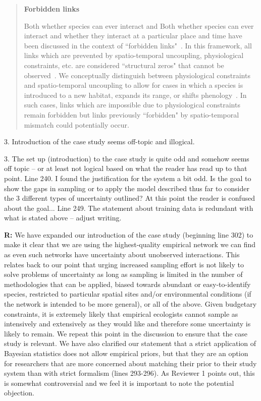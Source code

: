 \documentclass[12pt]{letter}
\newenvironment{refquote}{\bigskip \begin{it}}{\end{it}\smallskip}
\begin{document}
		\begin{quotation}
        \textbf{Forbidden links}

            Both whether species can ever interact and Both whether species can ever interact and whether they interact at a particular place and time have been discussed in the context of ``forbidden links"~\citep{Jordano2016}. In this framework, all links which are prevented by spatio-temporal uncoupling, physiological constraints, etc. are considered ``structural zeros" that cannot be observed~\citep{Jordano1987,Jordano2016}. We conceptually distinguish between physiological constraints and spatio-temporal uncoupling to allow for cases in which a species is introduced to a new habitat, expands its range, or shifts phenology~\citep{Gravel2013}. In such cases, links which are impossible due to physiological constraints remain forbidden but links previously ``forbidden" by spatio-temporal mismatch could potentially occur.
      \end{quotation}


	3. Introduction of the case study seems off-topic and illogical. 


		\begin{refquote}
		3.      The set up (introduction) to the case study is quite odd and somehow seems off topic – or at least not logical based on what the reader has read up to that point.
		\medskip
		Line 240.  I found the justification for the system a bit odd.  Is the goal to show the gaps in sampling or to apply the model described thus far to consider the 3 different types of uncertainty outlined?  At this point the reader is confused about the goal...
		\medskip
		Line 249.  The statement about training data is redundant with what is stated above – adjust writing.
		\end{refquote}


		\textbf{R:} We have expanded our introduction of the case study (beginning line 302) to make it clear that we are using the highest-quality empirical network we can find as even such networks have uncertainty about unobserved interactions. This relates back to our point that urging increased sampling effort is not likely to solve problems of uncertainty as long as sampling is limited in the number of methodologies that can be applied, biased towards abundant or easy-to-identify species, restricted to particular spatial sites and/or environmental conditions (if the network is intended to be more general), or all of the above. Given budgetary constraints, it is extremely likely that empirical ecologists cannot sample as intensively and extensively as they would like and therefore some uncertainty is likely to remain. We repeat this point in the discussion to ensure that the case study is relevant. We have also clarified our statement that a strict application of Bayesian statistics does not allow empirical priors, but that they are an option for researchers that are more concerned about matching their prior to their study system than with strict formalism (lines 293-296). As Reviewer 1 points out, this is somewhat controversial and we feel it is important to note the potential objection.
\end{document}
